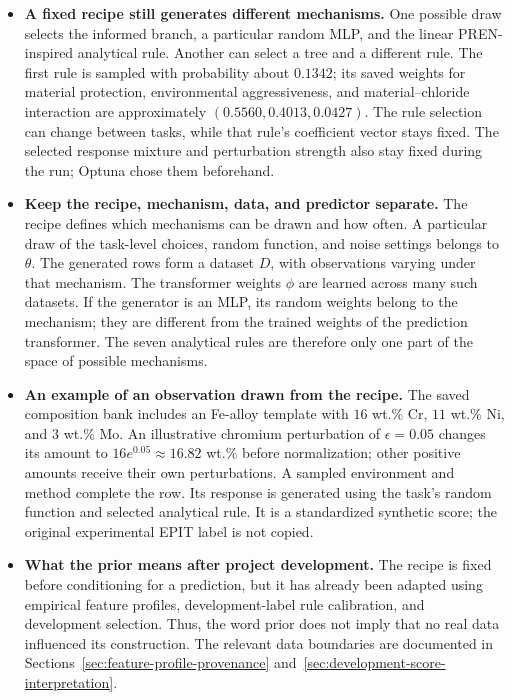 \documentclass[11pt]{article}
\newenvironment{notes}
  {\begin{itemize}\setlength{\itemsep}{0.45em}\setlength{\parsep}{0pt}}
  {\end{itemize}}
\begin{document}
\begin{notes}
    \item \textbf{A fixed recipe still generates different mechanisms.}
    One possible draw selects the informed branch, a particular
    random MLP, and the linear PREN-inspired analytical rule.
    Another can select a tree and a different rule. The first
    rule is sampled with probability about \(0.1342\); its
    saved weights for material protection, environmental
    aggressiveness, and material--chloride interaction are
    approximately \((0.5560,0.4013,0.0427)\).
    The rule selection can change between tasks, while that
    rule's coefficient vector stays fixed. The selected response
    mixture and perturbation strength also stay fixed during
    the run; Optuna chose them beforehand.

    \item \textbf{Keep the recipe, mechanism, data, and predictor separate.}
    The recipe defines which mechanisms can be drawn and how often.
    A particular draw of the task-level choices, random function,
    and noise settings belongs to \(\theta\). The generated rows
    form a dataset \(D\), with observations varying under that
    mechanism. The transformer weights \(\phi\) are learned across
    many such datasets. If the generator is an MLP, its random
    weights belong to the mechanism; they are different from the
    trained weights of the prediction transformer. The seven
    analytical rules are therefore only one part of the space of
    possible mechanisms.

    \item \textbf{An example of an observation drawn from the recipe.}
    The saved composition bank includes an Fe-alloy template with
    \(16\) wt.\% Cr, \(11\) wt.\% Ni, and \(3\) wt.\% Mo.
    An illustrative chromium perturbation of \(\epsilon=0.05\)
    changes its amount to \(16e^{0.05}\approx16.82\) wt.\%
    before normalization; other positive amounts receive their own
    perturbations. A sampled environment and method complete the
    row. Its response is generated using the task's random function
    and selected analytical rule. It is a standardized synthetic
    score; the original experimental EPIT label is not copied.

    \item \textbf{What the prior means after project development.}
    The recipe is fixed before conditioning for a prediction,
    but it has already been adapted using empirical feature
    profiles, development-label rule calibration, and development
    selection. Thus, the word prior does not imply that no real
    data influenced its construction. The relevant data boundaries
    are documented in Sections~\ref{sec:feature-profile-provenance}
    and~\ref{sec:development-score-interpretation}.


\end{notes}
\end{document}
